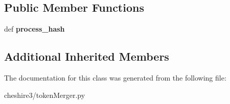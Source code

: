 \subsection*{Public Member Functions}
\begin{DoxyCompactItemize}
\item 
\hypertarget{classcheshire3_1_1token_merger_1_1_proximity_token_merger_aad3923e8c8218b358c82987949304bb5}{def {\bfseries process\-\_\-hash}}\label{classcheshire3_1_1token_merger_1_1_proximity_token_merger_aad3923e8c8218b358c82987949304bb5}

\end{DoxyCompactItemize}
\subsection*{Additional Inherited Members}


The documentation for this class was generated from the following file\-:\begin{DoxyCompactItemize}
\item 
cheshire3/token\-Merger.\-py\end{DoxyCompactItemize}
